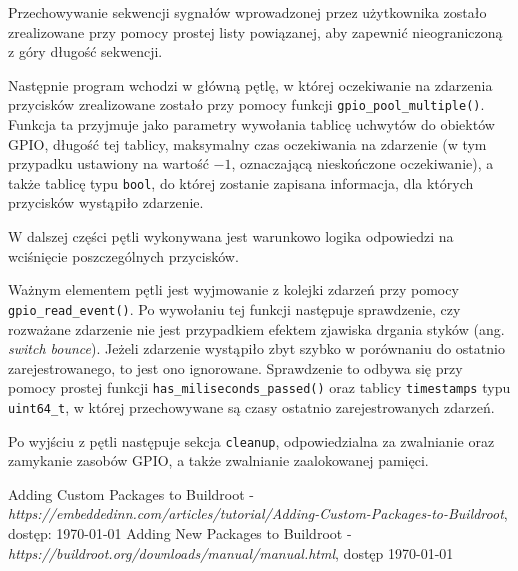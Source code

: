 \documentclass{article}
\begin{document}
Przechowywanie sekwencji sygnałów wprowadzonej przez użytkownika zostało zrealizowane przy pomocy prostej listy powiązanej, aby zapewnić nieograniczoną z góry długość sekwencji.

Następnie program wchodzi w główną pętlę, w której oczekiwanie na zdarzenia przycisków zrealizowane zostało przy pomocy funkcji \texttt{gpio\_pool\_multiple()}. Funkcja ta przyjmuje jako parametry wywołania tablicę uchwytów do obiektów GPIO, długość tej tablicy, maksymalny czas oczekiwania na zdarzenie (w tym przypadku ustawiony na wartość $-1$, oznaczającą nieskończone oczekiwanie), a także tablicę typu \texttt{bool}, do której zostanie zapisana informacja, dla których przycisków wystąpiło zdarzenie.

W dalszej części pętli wykonywana jest warunkowo logika odpowiedzi na wciśnięcie poszczególnych przycisków. 

Ważnym elementem pętli jest wyjmowanie z kolejki zdarzeń przy pomocy \texttt{gpio\_read\_event()}. Po wywołaniu tej funkcji następuje sprawdzenie, czy rozważane zdarzenie nie jest przypadkiem efektem zjawiska drgania styków (ang. \textit{switch bounce}). Jeżeli zdarzenie wystąpiło zbyt szybko w porównaniu do ostatnio zarejestrowanego, to jest ono ignorowane. Sprawdzenie to odbywa się przy pomocy prostej funkcji \texttt{has\_miliseconds\_passed()} oraz tablicy \texttt{timestamps} typu \texttt{uint64\_t}, w której przechowywane są czasy ostatnio zarejestrowanych zdarzeń.

Po wyjściu z pętli następuje sekcja \texttt{cleanup}, odpowiedzialna za zwalnianie oraz zamykanie zasobów GPIO, a także zwalnianie zaalokowanej pamięci.


\begin{thebibliography}{9}
 Adding Custom Packages to Buildroot - \textit{https://embeddedinn.com/articles/tutorial/Adding-Custom-Packages-to-Buildroot}, dostęp: \today
{} Adding New Packages to Buildroot - \textit{https://buildroot.org/downloads/manual/manual.html}, dostęp \today
\end{thebibliography}
\end{document}
